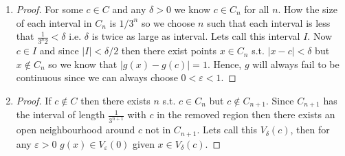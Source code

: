 \begin{enumerate}[label=(\alph*)]
    \item 
    \begin{proof}
        For some $c\in C$ and any $\delta>0$ we know $c\in C_n$ for all $n$.
        How the size of each interval in $C_n$ is $1/3^n$ so we choose $n$ such 
        that each interval is less that $\frac{1}{3^n 2} < \delta$ i.e. 
        $\delta$ is twice as large as interval. Lets call this interval $I$.
        Now $c\in I$ and since $|I|< \delta /2 $ then there exist points $x\in C_n$ 
        s.t. $|x-c|<\delta$ but $x\not\in C_n$ so we know 
        that $|g(x)-g(c)|=1$. Hence, $g$ will always fail to be continuous since
        we can always choose $0<\varepsilon < 1$.
    \end{proof}

    \item 
    \begin{proof}
        If $c\not\in C$ then there exists $n$ s.t. $c\in C_n$ but
        $c\not\in C_{n+1}$. Since $C_{n+1}$ has the interval of 
        length $\frac{1}{3^{n+1}}$ with $c$ in the removed region then 
        there exists an open neighbourhood around $c$ not in $C_{n+1}$.
        Lets call this $V_\delta(c)$, then for any $\varepsilon>0$ 
        $g(x)\in V_\varepsilon(0)$ given $x\in V_\delta(c)$.
    \end{proof}
\end{enumerate}